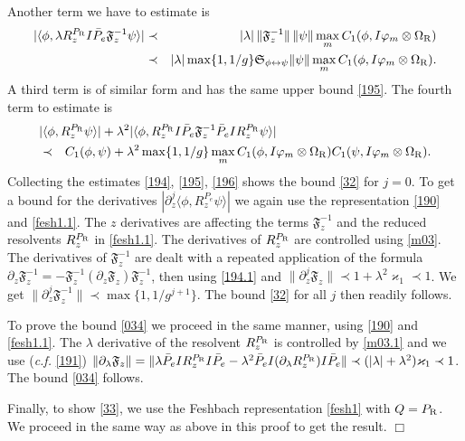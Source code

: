 \documentclass[letterpaper,onecolumn,11pt,accepted=2021-12-09]{quantumarticle}
\numberwithin{equation}{section}
\newcommand{\sym}{ {\mathfrak S}_{\phi\leftrightarrow\psi}}
\renewcommand{\r}{{\rm R}}
\def\qed{\hfill $\Box$\medskip}
\begin{document}
Another term we have to estimate is 
\begin{eqnarray}
|\langle \phi, \lambda R_z^{P_\r} I \bar P_e {\mathfrak F}_z^{-1}\psi\rangle| &\prec& |\lambda|\, \|{\mathfrak F}_z^{-1}\|\, \|\psi\| \max_m C_1(\phi, I \varphi_m\otimes \Omega_\r)\nonumber\\
&\prec& |\lambda| \max\{1,1/g\} \sym \|\psi\| \max_m C_1(\phi, I \varphi_m\otimes \Omega_\r).
\label{195}
\end{eqnarray}
A third term is of similar form and has the same upper bound \eqref{195}. The fourth term to estimate is 
\begin{eqnarray}
\lefteqn{
|\langle \phi, R_z^{P_\r}\psi\rangle |+ \lambda^2 |\langle\phi, R_z^{P_\r} I\bar P_e {\mathfrak F}_z^{-1} \bar P_e I R_z^{P_\r}\psi\rangle | }\nonumber\\
 &\prec& C_1(\phi,\psi)+ \lambda^2 \max\{1,1/g\} \max_m C_1(\phi, I\varphi_m\otimes\Omega_\r) C_1(\psi, I\varphi_m\otimes\Omega_\r). 
 \label{196}
\end{eqnarray}
Collecting the estimates \eqref{194}, \eqref{195}, \eqref{196} shows the bound \eqref{32} for $j=0$. To get a bound for the derivatives $|\partial_z^j\langle\phi, R_z^{P_e}\psi\rangle|$ we again use the representation \eqref{190} and \eqref{fesh1.1}. The $z$ derivatives are affecting the terms ${\mathfrak F}_z^{-1}$  and the reduced resolvents $R_z^{P_\r}$ in \eqref{fesh1.1}. The derivatives of $R_z^{P_\r}$ are controlled using \eqref{m03}. The derivatives of ${\mathfrak F}_z^{-1}$ are dealt with a repeated application of the formula $\partial_z {\mathfrak F}_z^{-1} = -{\mathfrak F}_z^{-1} (\partial _z {\mathfrak F}_z){\mathfrak F}_z^{-1}$, then using \eqref{194.1} and $\|\partial_z^j{\mathfrak F}_z\|\prec 1+\lambda^2\varkappa_1\prec 1$.  We get $\|\partial_z^j{\mathfrak F}_z^{-1}\|\prec \max\{1,1/g^{j+1}\}$. The bound \eqref{32} for all $j$ then readily follows. 

To prove the bound \eqref{034} we proceed in the same manner, using \eqref{190} and \eqref{fesh1.1}. The $\lambda$ derivative of the resolvent $R_z^{P_\r}$ is controlled by \eqref{m03.1} and we use ({\em c.f.} \eqref{191}) $\|\partial_\lambda {\mathfrak F}_z \|= \|\lambda \bar P_eIR_z^{P_\r}I\bar P_e -\lambda^2 \bar P_eI(\partial_\lambda R_z^{P_\r})I\bar P_e\| \prec (|\lambda| +\lambda^2) \varkappa_1\prec 1$. The bound \eqref{034}  follows.

Finally, to show \eqref{33}, we use the Feshbach representation \eqref{fesh1} with $Q=P_\r$. We proceed in the same way as above in this proof to get the result. \hfill \qed
\end{document}
